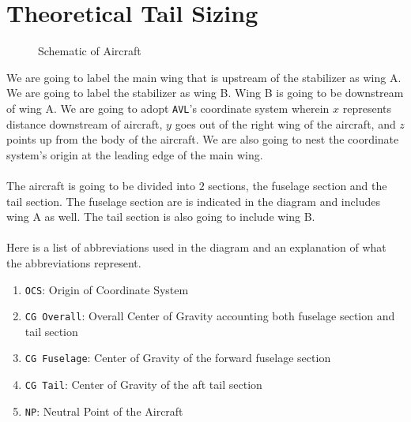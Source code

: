 

\section{Theoretical Tail Sizing}
\begin{comment}
\end{comment}

\begin{figure}[H]\centering
\def\svgwidth{523px}

\caption{Schematic of Aircraft}
\label{Aircraft Diagram}
\end{figure}

We are going to label the main wing that is upstream of the stabilizer as wing A.
We are going to label the stabilizer as wing B. Wing B is going to be downstream of wing A.
We are going to adopt \texttt{AVL}'s coordinate system wherein $x$ represents distance downstream of aircraft, $y$ goes out of the right wing of the aircraft, and $z$ points up from the body of the aircraft.
We are also going to nest the coordinate system's origin at the leading edge of the main wing.
\\~\\The aircraft is going to be divided into $2$ sections, the fuselage section and the tail section. 
The fuselage section are is indicated in the diagram and includes wing A as well.
The tail section is also going to include wing B.
\\~\\Here is a list of abbreviations used in the diagram and an explanation of what the abbreviations represent.
\begin{enumerate}
\item \texttt{OCS}: Origin of Coordinate System
\item \texttt{CG Overall}: Overall Center of Gravity accounting both fuselage section and tail section
\item \texttt{CG Fuselage}: Center of Gravity of the forward fuselage section
\item \texttt{CG Tail}: Center of Gravity of the aft tail section
\item \texttt{NP}: Neutral Point of the Aircraft
\end{enumerate}

